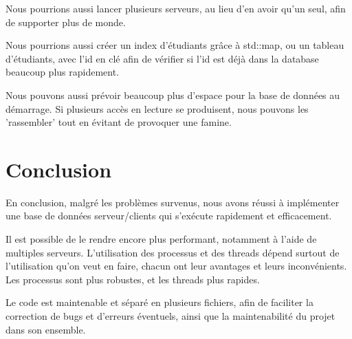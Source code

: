 \documentclass[utf8]{article}
\begin{document}
\begin{large}
Nous pourrions aussi lancer plusieurs serveurs, au lieu d'en avoir qu'un seul,
afin de supporter plus de monde.

Nous pourrions aussi créer un index d'étudiants grâce à std::map, ou un tableau
d'étudiants, avec l'id en clé afin de vérifier si l'id est déjà dans la database
beaucoup plus rapidement.

Nous pouvons aussi prévoir beaucoup plus d'espace pour la base de données au démarrage.
Si plusieurs accès en lecture se produisent, nous pouvons les 'rassembler' tout
en évitant de provoquer une famine.
\section{Conclusion}
\par
\indent
En conclusion, malgré les problèmes survenus, nous avons réussi à implémenter
une base de données serveur/clients qui s'exécute rapidement et
efficacement.
\par 
Il est possible de le rendre encore plus performant, notamment
à l'aide de multiples serveurs. L'utilisation des processus et des threads
dépend surtout de l'utilisation qu'on veut en faire, chacun ont leur avantages
et leurs inconvénients. Les processus sont plus robustes, et les threads plus rapides.

Le code est maintenable et séparé en plusieurs fichiers,
afin de faciliter la correction de bugs et d'erreurs éventuels, ainsi que la
maintenabilité du projet dans son ensemble.
\par

\end{large}
\end{document}
